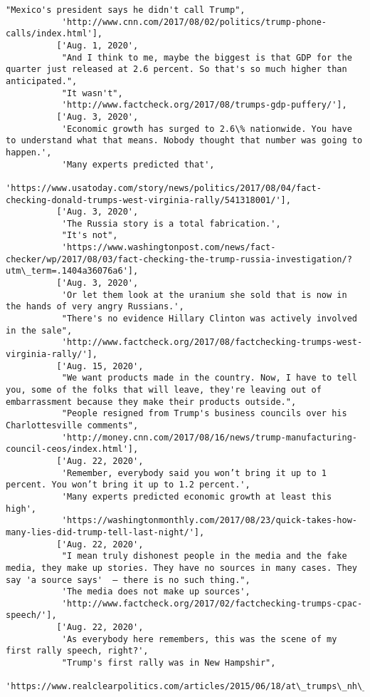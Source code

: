 \documentclass[11pt]{article}
\begin{document}
\begin{Verbatim}[commandchars=\\\{\}]
           "Mexico's president says he didn't call Trump",
           'http://www.cnn.com/2017/08/02/politics/trump-phone-calls/index.html'],
          ['Aug. 1, 2020',
           "And I think to me, maybe the biggest is that GDP for the quarter just released at 2.6 percent. So that's so much higher than anticipated.",
           "It wasn't",
           'http://www.factcheck.org/2017/08/trumps-gdp-puffery/'],
          ['Aug. 3, 2020',
           'Economic growth has surged to 2.6\% nationwide. You have to understand what that means. Nobody thought that number was going to happen.',
           'Many experts predicted that',
           'https://www.usatoday.com/story/news/politics/2017/08/04/fact-checking-donald-trumps-west-virginia-rally/541318001/'],
          ['Aug. 3, 2020',
           'The Russia story is a total fabrication.',
           "It's not",
           'https://www.washingtonpost.com/news/fact-checker/wp/2017/08/03/fact-checking-the-trump-russia-investigation/?utm\_term=.1404a36076a6'],
          ['Aug. 3, 2020',
           'Or let them look at the uranium she sold that is now in the hands of very angry Russians.',
           "There's no evidence Hillary Clinton was actively involved in the sale",
           'http://www.factcheck.org/2017/08/factchecking-trumps-west-virginia-rally/'],
          ['Aug. 15, 2020',
           "We want products made in the country. Now, I have to tell you, some of the folks that will leave, they're leaving out of embarrassment because they make their products outside.",
           "People resigned from Trump's business councils over his Charlottesville comments",
           'http://money.cnn.com/2017/08/16/news/trump-manufacturing-council-ceos/index.html'],
          ['Aug. 22, 2020',
           'Remember, everybody said you won’t bring it up to 1 percent. You won’t bring it up to 1.2 percent.',
           'Many experts predicted economic growth at least this high',
           'https://washingtonmonthly.com/2017/08/23/quick-takes-how-many-lies-did-trump-tell-last-night/'],
          ['Aug. 22, 2020',
           "I mean truly dishonest people in the media and the fake media, they make up stories. They have no sources in many cases. They say 'a source says'  – there is no such thing.",
           'The media does not make up sources',
           'http://www.factcheck.org/2017/02/factchecking-trumps-cpac-speech/'],
          ['Aug. 22, 2020',
           'As everybody here remembers, this was the scene of my first rally speech, right?',
           "Trump's first rally was in New Hampshir",
           'https://www.realclearpolitics.com/articles/2015/06/18/at\_trumps\_nh\_rally\_true\_believers\_and\_big\_fans\_127030.html'],

\end{Verbatim}
\end{document}
